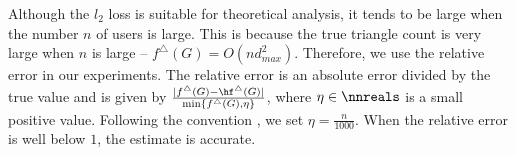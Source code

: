 Although the $l_2$ loss is suitable for theoretical analysis, it tends to be large when the number $n$ of users is large. 
This is because the true triangle count is very large when $n$ is large -- $f^\triangle(G) = O(n d_{max}^2)$. 
Therefore, we use the relative error in our experiments. 
The relative error is an absolute error divided by the true value and is given by $\frac{|f^\triangle(G) - \hf^\triangle(G)|}{\min\{f^\triangle(G), \eta\}}$, where $\eta \in \nnreals$ is a small positive value. 
Following the convention \cite{Bindschaedler_SP16,Chen_CCS12,Xiao_SIGMOD11}, we set $\eta = \frac{n}{1000}$. 
When the relative error is well below $1$, the estimate is accurate. 